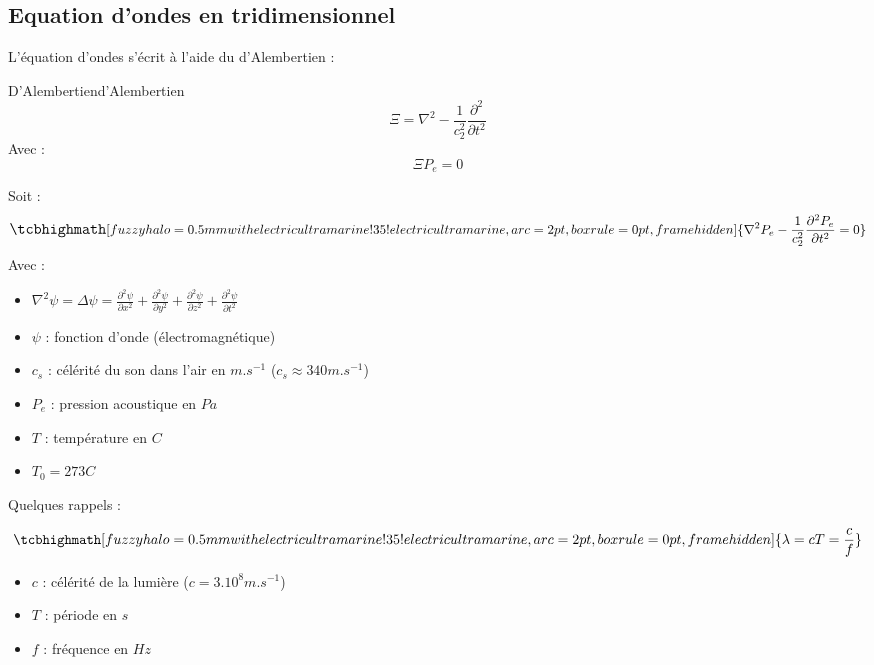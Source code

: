 \subsection{Equation d'ondes en tridimensionnel}
L'équation d'ondes s'écrit à l'aide du d'Alembertien : 
\begin{definition}{D'Alembertien}{d'Alembertien}
    \[ \Xi = \nabla^{2} - \frac{1}{c_{2}^{2}}\frac{\partial^{2}}{\partial t^{2}} \] Avec  : \[ \Xi P_{e} = 0 \]
\end{definition}
Soit :
\begin{equation}
    \large
    \tcbhighmath[fuzzy halo=0.5mm with electricultramarine!35!electricultramarine,arc=2pt,
    boxrule=0pt,frame hidden]{ 
        \nabla^{2}P_{e} - \frac{1}{c_{2}^{2}}\frac{\partial^{2} P_{e}}{\partial t^{2}} = 0 \nonumber
     } \nonumber
    \normalsize
\end{equation}
Avec : \newline
\large
\begin{itemize}
    \item $\nabla^{2}\psi = \Delta \psi = \frac{\partial^{2} \psi}{\partial x^{2}} + \frac{\partial^{2} \psi}{\partial y^{2}} + \frac{\partial^{2} \psi}{\partial z^{2}} + \frac{\partial^{2} \psi}{\partial t^{2}}$ \newline
    \item $\psi$ : fonction d'onde (électromagnétique) \newline
    \item $c_{s}$ : célérité du son dans l'air en $m.s^{-1}$ ($c_{s} \approx 340 m.s^{-1}$) \newline
    \item $P_{e}$ : pression acoustique en $Pa$ \newline
    \item $T$ : température en $C$ \newline
    \item $T_{0} = 273 C$
\end{itemize}
\normalsize
\vfil
Quelques rappels : 

\begin{equation}
    \normalsize
    \tcbhighmath[fuzzy halo=0.5mm with electricultramarine!35!electricultramarine,arc=2pt,
    boxrule=0pt,frame hidden]{ 
        \lambda = cT = \frac{c}{f}
     } \nonumber
    \normalsize
\end{equation}
\begin{itemize}
    \item $c$ : célérité de la lumière ($c = 3.10^{8} m.s^{-1}$)
    \item $T$ : période en $s$
    \item $f$ : fréquence en $Hz$
\end{itemize}
\newpage
